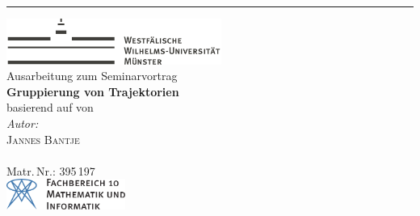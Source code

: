 \begin{titlepage}
\hspace*{0.12\textwidth}%
\rule{2pt}{\textheight}%
\hspace*{0.05\textwidth}%
\begin{minipage}[b]{0.80\textwidth}
	\raggedright
	\includegraphics[height=1.5cm, keepaspectratio]{Bilder/Logo_WWU_Muenster.pdf} \\[2cm]
	{\Large \sffamily Ausarbeitung zum Seminarvortrag}\\[0.5cm]
	{\Huge\sffamily\bfseries Gruppierung von Trajektorien}\\[.5cm]
	{\large\sffamily basierend auf  von \citeauthor{buchin2015}}\\[5cm]
	{\large \textit{Autor:}}\\[5pt]
	{\Large \textsc{Jannes Bantje}}\\[5pt] %
	{\small{}\\ Matr.\,Nr.: 395\,197}\\[2.5cm]
	
	\vspace{0.1\textheight}
	\includegraphics[height=1cm, keepaspectratio]{Bilder/fb10logo.pdf}
\end{minipage}	



\end{titlepage}
